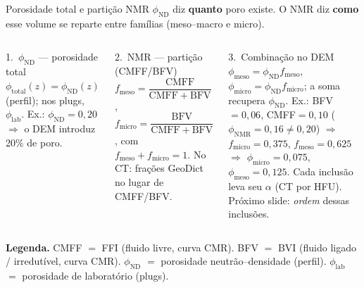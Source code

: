 \documentclass[aspectratio=169,10pt]{beamer}
\newcommand{\philab}{\ensuremath{\phi_{\mathrm{lab}}}}
\newcommand{\phiND}{\ensuremath{\phi_{\mathrm{ND}}}}
\begin{document}
\begin{frame}{Porosidade total e partição NMR}
  \footnotesize
  $\phiND{}$ diz \textbf{quanto} poro existe. O NMR diz \textbf{como}
  esse volume se reparte entre famílias (meso--macro e micro).
  \vspace{0.06cm}
  \begin{columns}[T,onlytextwidth]
    \begin{block}{1.\ $\phiND{}$ --- porosidade total}
      \scriptsize
      $\phi_{\mathrm{total}}(z)=\phiND{}(z)$ (perfil);
      nos plugs, $\philab{}$.
      Ex.: $\phiND{}=0{,}20$ $\Rightarrow$ o DEM introduz 20\% de poro.
    \end{block}
    \vspace{0.08cm}
    \begin{block}{2.\ NMR --- partição (CMFF/BFV)}
      \scriptsize
      $f_{\mathrm{meso}}=\dfrac{\mathrm{CMFF}}{\mathrm{CMFF}+\mathrm{BFV}}$,
      $f_{\mathrm{micro}}=\dfrac{\mathrm{BFV}}{\mathrm{CMFF}+\mathrm{BFV}}$,
      com $f_{\mathrm{meso}}+f_{\mathrm{micro}}=1$.
      No CT: frações GeoDict no lugar de CMFF/BFV.
    \end{block}
    \begin{exampleblock}{3.\ Combinação no DEM}
      \scriptsize
      $\phi_{\mathrm{meso}}=\phiND{}f_{\mathrm{meso}}$,
      $\phi_{\mathrm{micro}}=\phiND{}f_{\mathrm{micro}}$;
      a soma recupera $\phiND{}$.
      \vspace{0.06cm}
      Ex.: BFV$=0{,}06$, CMFF$=0{,}10$
      ($\phi_{\mathrm{NMR}}=0{,}16\neq 0{,}20$)
      $\Rightarrow$ $f_{\mathrm{micro}}=0{,}375$,
      $f_{\mathrm{meso}}=0{,}625$
      $\Rightarrow$ $\phi_{\mathrm{micro}}=0{,}075$,
      $\phi_{\mathrm{meso}}=0{,}125$.
      \vspace{0.06cm}
      Cada inclusão leva seu $\alpha$ (CT por HFU).
      Próximo slide: \emph{ordem} dessas inclusões.
    \end{exampleblock}
  \end{columns}
  \vspace{0.10cm}
  {\centering
  \tiny
  \textbf{Legenda.}
  CMFF $=$ FFI (fluido livre, curva CMR).
  BFV $=$ BVI (fluido ligado / irredutível, curva CMR).
  \phiND{} $=$ porosidade neutrão--densidade (perfil).
  \philab{} $=$ porosidade de laboratório (plugs).
  \par}
\end{frame}
\end{document}
